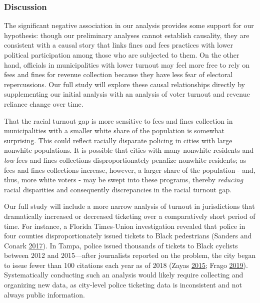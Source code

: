 \documentclass[
  12pt,
]{article}
\begin{document}
\hypertarget{discussion}{%
\subsubsection*{Discussion}\label{discussion}}

The significant negative association in our analysis provides some support for our hypothesis: though our preliminary analyses cannot establish causality, they are consistent with a causal story that links fines and fees practices with lower political participation among those who are subjected to them. On the other hand, officials in municipalities with lower turnout may feel more free to rely on fees and fines for revenue collection because they have less fear of electoral repercussions. Our full study will explore these causal relationships directly by supplementing our initial analysis with an analysis of voter turnout and revenue reliance change over time.

That the racial turnout gap is more sensitive to fees and fines collection in municipalities with a smaller white share of the population is somewhat surprising. This could reflect racially disparate policing in cities with large nonwhite populations. It is possible that cities with many nonwhite residents and \emph{low} fees and fines collections disproportionately penalize nonwhite residents; as fees and fines collections increase, however, a larger share of the population - and, thus, more white voters - may be swept into these programs, thereby \emph{reducing} racial disparities and consequently discrepancies in the racial turnout gap.

Our full study will include a more narrow analysis of turnout in jurisdictions that dramatically increased or decreased ticketing over a comparatively short period of time. For instance, a Florida Times-Union investigation revealed that police in four counties disproportionately issued tickets to Black pedestrians (Sanders and Conark \protect\hyperlink{ref-Sanders2017}{2017}). In Tampa, police issued thousands of tickets to Black cyclists between 2012 and 2015---after journalists reported on the problem, the city began to issue fewer than 100 citations each year as of 2018 (Zayas \protect\hyperlink{ref-Zayas2015}{2015}; Frago \protect\hyperlink{ref-Frago2019}{2019}). Systematically conducting such an analysis would likely require collecting and organizing new data, as city-level police ticketing data is inconsistent and not always public information.
\end{document}
